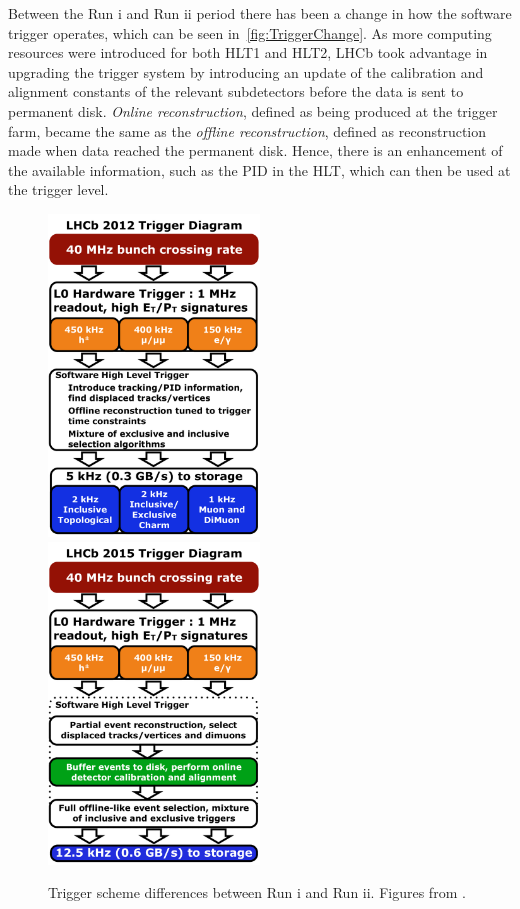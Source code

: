 Between the Run \Rn{1} and Run \Rn{2} period there has been a change in how the software trigger operates, which can be seen in~\autoref{fig:TriggerChange}. As more computing resources were introduced for both \Gls{HLT1} and \Gls{HLT2}, \Gls{LHCb} took advantage in upgrading the trigger system by introducing an update of the calibration and alignment constants of the relevant subdetectors before the data is sent to permanent disk. \textit{Online reconstruction}, defined as being produced at the trigger farm, became the same as the \textit{offline reconstruction}, defined as reconstruction made when data reached the permanent disk. Hence, there is an enhancement of the available information, such as the \Gls{PID} in the \Gls{HLT}, which can then be used at the trigger level. 


\begin{figure}[!h]
	\centering
	\includegraphics[width = 0.5\textwidth]{figs/detector/LHCb_Trigger_RunIAlg.pdf}%
	\includegraphics[width = 0.5\textwidth]{figs/detector/LHCb_Trigger_RunII.pdf}%
	\caption{Trigger scheme differences between Run \Rn{1} and Run \Rn{2}. Figures from \cite{triggerscheme}.}  
	\label{fig:TriggerChange}
\end{figure}


